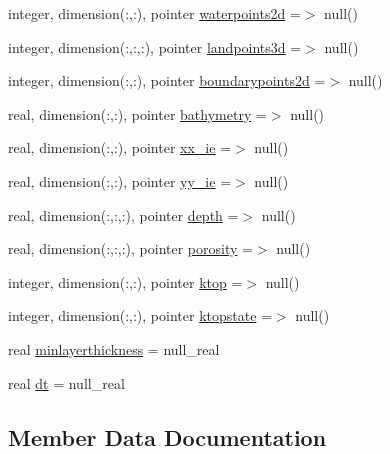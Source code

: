 \begin{DoxyCompactItemize}
integer, dimension(\+:,\+:), pointer \mbox{\hyperlink{structmodulesedimentproperties_1_1t__external_ac2ce6bffd62a5ec29011c46e042f3c9b}{waterpoints2d}} =$>$ null()
\item 
integer, dimension(\+:,\+:,\+:), pointer \mbox{\hyperlink{structmodulesedimentproperties_1_1t__external_a0a574501bb57f54f87cce88ef66d3fbb}{landpoints3d}} =$>$ null()
\item 
integer, dimension(\+:,\+:), pointer \mbox{\hyperlink{structmodulesedimentproperties_1_1t__external_aeff28403cf6f6d5926eb64f3c99dd484}{boundarypoints2d}} =$>$ null()
\item 
real, dimension(\+:,\+:), pointer \mbox{\hyperlink{structmodulesedimentproperties_1_1t__external_aad2b8c787fce9c2a90976255c88a612f}{bathymetry}} =$>$ null()
\item 
real, dimension(\+:,\+:), pointer \mbox{\hyperlink{structmodulesedimentproperties_1_1t__external_ac48156ed0b3d9728e60c3c995d3fefaf}{xx\+\_\+ie}} =$>$ null()
\item 
real, dimension(\+:,\+:), pointer \mbox{\hyperlink{structmodulesedimentproperties_1_1t__external_a8e6f3450fdd46ddd2e1b72fd20e442a0}{yy\+\_\+ie}} =$>$ null()
\item 
real, dimension(\+:,\+:,\+:), pointer \mbox{\hyperlink{structmodulesedimentproperties_1_1t__external_a42be7cd126ac1fc02e405b6c51136d99}{depth}} =$>$ null()
\item 
real, dimension(\+:,\+:,\+:), pointer \mbox{\hyperlink{structmodulesedimentproperties_1_1t__external_ab3aa6ccad19e6389bb6802f57b98d7dd}{porosity}} =$>$ null()
\item 
integer, dimension(\+:,\+:), pointer \mbox{\hyperlink{structmodulesedimentproperties_1_1t__external_ae8c6d61e181914325c15b2d12ab97eeb}{ktop}} =$>$ null()
\item 
integer, dimension(\+:,\+:), pointer \mbox{\hyperlink{structmodulesedimentproperties_1_1t__external_aee62ba8bbace1a5a7f167c2e3a418aec}{ktopstate}} =$>$ null()
\item 
real \mbox{\hyperlink{structmodulesedimentproperties_1_1t__external_aa604a16be24559c4450a56e070160379}{minlayerthickness}} = null\+\_\+real
\item 
real \mbox{\hyperlink{structmodulesedimentproperties_1_1t__external_adbb502f5b00bec6948944240e8ea3067}{dt}} = null\+\_\+real
\end{DoxyCompactItemize}


\subsection{Member Data Documentation}
\mbox{\label{structmodulesedimentproperties_1_1t__external_aad2b8c787fce9c2a90976255c88a612f}} 
